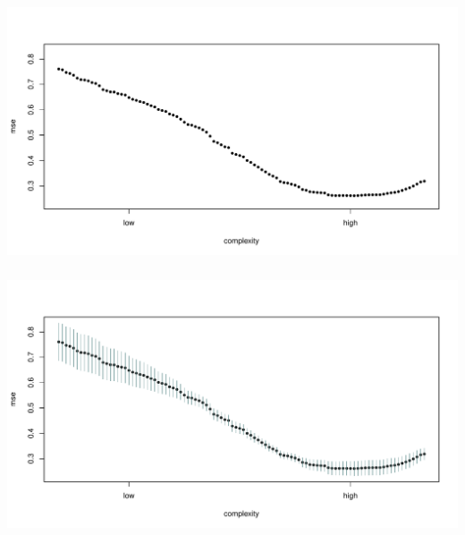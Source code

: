 \documentclass[xetex,mathserif,serif,aspectratio=169]{beamer}
\begin{document}
\begin{frame}[fragile] \frametitle{} \oldB \small

\begin{center}
\includegraphics[width=\textwidth]{img/cv2.pdf}
\end{center}

\end{frame}

\begin{frame}[fragile] \frametitle{} \oldB \small

\begin{center}
\includegraphics[width=\textwidth]{img/cv3.pdf}
\end{center}

\end{frame}
\end{document}
